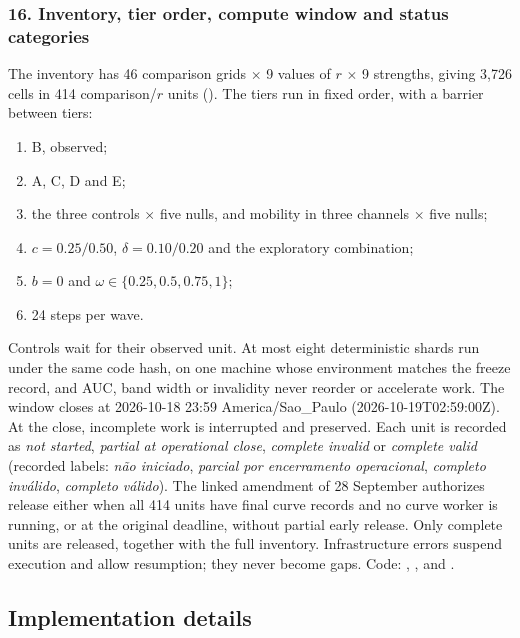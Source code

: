 \subsubsection*{16. Inventory, tier order, compute window and status categories}
The inventory has 46 comparison grids $\times$ 9 values of $r$ $\times$ 9 strengths, giving 3,726 cells in 414 comparison/$r$ units (). The tiers run in fixed order, with a barrier between tiers:
\begin{enumerate}
\item B, observed;
\item A, C, D and E;
\item the three controls $\times$ five nulls, and mobility in three channels $\times$ five nulls;
\item $c=0.25/0.50$, $\delta=0.10/0.20$ and the exploratory combination;
\item $b=0$ and $\omega\in\{0.25,0.5,0.75,1\}$;
\item 24 steps per wave.
\end{enumerate}
Controls wait for their observed unit. At most eight deterministic shards run under the same code hash, on one machine whose environment matches the freeze record, and AUC, band width or invalidity never reorder or accelerate work. The window closes at 2026-10-18 23:59 America/Sao\_Paulo (2026-10-19T02:59:00Z). At the close, incomplete work is interrupted and preserved. Each unit is recorded as \emph{not started}, \emph{partial at operational close}, \emph{complete invalid} or \emph{complete valid} (recorded labels: \textit{não iniciado}, \textit{parcial por encerramento operacional}, \textit{completo inválido}, \textit{completo válido}). The linked amendment of 28 September authorizes release either when all 414 units have final curve records and no curve worker is running, or at the original deadline, without partial early release. %
Only complete units are released, together with the full inventory. %
Infrastructure errors suspend execution and allow resumption; they never become gaps. Code: , ,  and .

\subsection{Implementation details}

